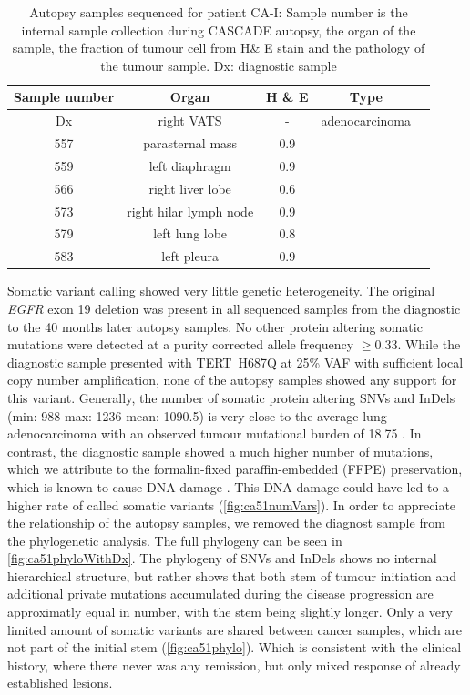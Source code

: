 \begin{table}[ht]
	\caption[Autopsy samples sequenced for patient CA-I]{Autopsy samples sequenced for patient CA-I: Sample number is the internal sample collection during CASCADE autopsy, the organ of the sample, the fraction of tumour cell from H\& E stain and the pathology of the tumour sample. Dx: diagnostic sample} \label{tab:ca51wesSamples}
	\centering
	\begin{tabular}{|c|c|c|c|c|}
	\toprule
	\hline
 	\rowcolor{gray!50}
\textbf{Sample number} & \textbf{Organ} & \textbf{H \& E} & \textbf{Type}\\
	\hline
 Dx & right VATS & - &  adenocarcinoma \\
 557 & parasternal mass & 0.9 & \cellcolor{gray!15} \\
 559 & left diaphragm & 0.9 & \cellcolor{gray!15} \\
 566 & right liver lobe & 0.6 & \cellcolor{gray!15} \\
 573 & right hilar lymph node & 0.9 & \cellcolor{gray!15} \\
 579 & left lung lobe & 0.8 & \cellcolor{gray!15} \\
 583 & left pleura & 0.9 & \cellcolor{gray!15}\multirow{-6}{*}{small cell} \\
 	\hline
	\bottomrule
	\end{tabular}
\end{table} 


Somatic variant calling showed very little genetic heterogeneity. The original \textit{EGFR} exon 19 deletion was present in all sequenced samples from the diagnostic to the 40 months later autopsy samples. No other protein altering somatic mutations were detected at a purity corrected allele frequency $\geq 0.33$. While the diagnostic sample presented with TERT~H687Q at 25\% VAF with sufficient local copy number amplification, none of the autopsy samples showed any support for this variant. Generally, the number of somatic protein altering SNVs and InDels (min: 988 max: 1236 mean: 1090.5)  is very close to the average lung adenocarcinoma with an observed tumour mutational burden of 18.75 \cite{Alexandrov2013}. 
In contrast, the diagnostic sample showed a much higher number of mutations, which we attribute to the formalin-fixed paraffin-embedded (FFPE) preservation, which is known to cause DNA damage \cite{Do2015}. This DNA damage could have led to a higher rate of called somatic variants (\autoref{fig:ca51numVars}). In order to appreciate the relationship of the autopsy samples, we removed the diagnost sample from the phylogenetic analysis. The full phylogeny can be seen in \autoref{fig:ca51phyloWithDx}. The phylogeny of SNVs and InDels shows no internal hierarchical structure, but rather shows that both stem of tumour initiation and additional private mutations accumulated during the disease progression are approximatly equal in number, with the stem being slightly longer. Only a very limited amount of somatic variants are shared between cancer samples, which are not part of the initial stem (\autoref{fig:ca51phylo}). Which is consistent with the clinical history, where there never was any remission, but only mixed response of already established lesions.

